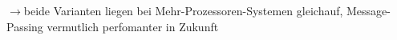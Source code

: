 $\rightarrow$beide Varianten liegen bei Mehr-Prozessoren-Systemen gleichauf, Message-Passing vermutlich perfomanter in Zukunft


